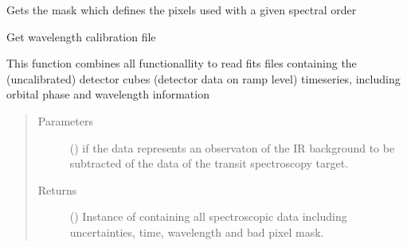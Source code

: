 \documentclass[a4paper,10pt,english]{sphinxmanual}
\begin{document}
\begin{fulllineitems}
\begin{fulllineitems}
\end{fulllineitems}


\begin{fulllineitems}
\label{\detokenize{cascade.instruments:cascade.instruments.instruments.SpitzerIRS._get_order_mask}}
Gets the mask which defines the pixels used with a given spectral order

\end{fulllineitems}


\begin{fulllineitems}
\label{\detokenize{cascade.instruments:cascade.instruments.instruments.SpitzerIRS._get_wavelength_calibration}}
Get wavelength calibration file

\end{fulllineitems}


\begin{fulllineitems}
\label{\detokenize{cascade.instruments:cascade.instruments.instruments.SpitzerIRS.get_detector_cubes}}
This function combines all functionallity to read fits files
containing the (uncalibrated) detector cubes (detector data
on ramp level) timeseries, including
orbital phase and wavelength information
\begin{quote}\begin{description}
\item[{Parameters}] \leavevmode
{} () \textendash{} if  the data represents an observaton of the IR background
to be subtracted of the data of the transit spectroscopy target.

\item[{Returns}] \leavevmode
{} () \textendash{} Instance of  containing all spectroscopic
data including uncertainties, time, wavelength and bad pixel mask.


\end{description}
\end{quote}
\end{fulllineitems}
\end{fulllineitems}
\end{document}
